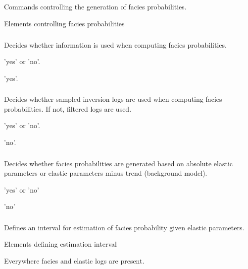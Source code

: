 \subsection{}
 \slist
   \item \Description Commands controlling the generation of facies probabilities.
   \item \Argument Elements controlling facies probabilities
   \item \Default
 \elist

\subsubsection{}
\slist
  \item \Description Decides whether \vs information is used when computing facies probabilities.
  \item \Argument 'yes' or 'no'.
  \item \Default 'yes'.
\elist

\subsubsection{}
\slist
  \item \Description Decides whether sampled inversion logs are used when computing facies probabilities. If not, filtered logs are used.
  \item \Argument 'yes' or 'no'.
  \item \Default 'no'.
\elist

\subsubsection{}  
 \slist
   \item \Description Decides whether facies probabilities are
     generated based on absolute elastic parameters or elastic
     parameters minus trend (background model).
   \item \Argument 'yes' or 'no'
   \item \Default 'no'
 \elist

\subsubsection{}
 \slist
   \item \Description Defines an interval for estimation of facies probability given elastic parameters.
   \item \Argument Elements defining estimation interval
   \item \Default Everywhere facies and elastic logs are present.
 \elist

